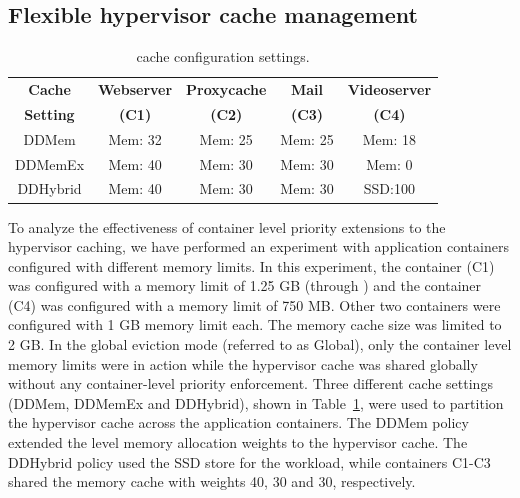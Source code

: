 \subsection{Flexible hypervisor cache management}
\label{subsec:flex}
%
\begin{table}[t]
\scriptsize
\begin{center}
\begin{tabular}{|c|c|c|c|c|}
\hline
{\bf Cache} & {\bf Webserver} & {\bf Proxycache} & {\bf Mail} & {\bf Videoserver} \\
{\bf Setting} & {\bf (C1)} & {\bf (C2)} & {\bf (C3)} & {\bf (C4)} \\
\hline 
\hline 
DDMem & Mem: 32 & Mem: 25 & Mem: 25 & Mem: 18 \\
DDMemEx & Mem: 40 & Mem: 30 & Mem: 30 & Mem: 0 \\
DDHybrid & Mem: 40 & Mem: 30 & Mem: 30 & SSD:100 \\
\hline 
\end{tabular}
\caption{\dd{} cache configuration settings.}
\vspace{-1cm}
\label{table:settings}
\end{center}
\end{table}
%
To analyze the effectiveness of container level priority extensions to the 
hypervisor caching, we have performed an experiment with application containers
configured with different memory limits.
%
In this experiment, the \web{} container (C1) was configured with a memory 
limit of 1.25 GB (through \cgroups) and the \video{} container (C4) was configured 
with a memory limit of 750 MB.
%
Other two containers were configured with 1 GB memory limit each.
%
The \dd{} memory cache size was limited to 2 GB.
%   
In the global eviction mode (referred to as Global), only the container 
level memory limits were in action while the \dd{} hypervisor cache was 
shared globally without any container-level priority enforcement.
%
Three different cache settings (DDMem, DDMemEx and DDHybrid), shown in 
Table~\ref{table:settings}, were used to partition the \dd{} hypervisor cache
across the application containers.
%
The DDMem policy extended the \cgroup{} level memory allocation weights to the
\dd{} hypervisor cache.
%
The DDHybrid policy used the SSD store for the \video{} workload, while
containers C1-C3  shared the memory cache with weights 40, 30 and 30, respectively.

